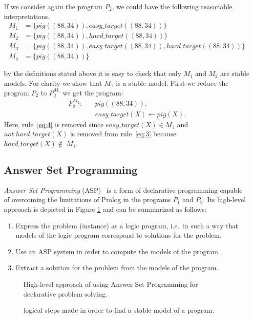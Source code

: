 If we consider again the program \(P_2\), we could have the following reasonable interpretations.
\begin{align*}
M_1&= \{pig((88,34)), \mathit{easy\_target}((88,34))\}  \\
M_2&= \{pig((88,34)), \mathit{hard\_target}((88,34))\} \\
M_3&= \{pig((88,34)), \mathit{easy\_target}((88,34)), \mathit{hard\_target}((88,34))\} \\
M_4&= \{pig((88,34))\}
\end{align*}

by the definitions stated above it is easy to check that only \(M_1\) and \(M_2\) are stable models. For clarity we show that \(M_1\) is a stable model. First we reduce the program \(P_2\) to \(P_2^{M_1}\) we get the program:
\begin{align}
P_2^{M_1} \colon \quad
&pig((88,34)). \\
&\mathit{easy\_target}(X) \leftarrow pig(X). 
\end{align}
Here, rule~\eqref{eq:4} is removed since \(\mathit{easy\_target}(X) \in M_1\) and \(not\; \mathit{hard\_target}(X)\) is removed from rule~\eqref{eq:3} because \(\mathit{hard\_target}(X) \notin\; M_1\).
\subsection{Answer Set Programming}

\emph{Answer Set Programming} (ASP)~\cite{aspPrime} is a form of declarative programming 
capable of overcoming the limitations of Prolog in the programs \(P_1\) and \(P_2\).
Its high-level approach is depicted in Figure \ref{fig:ASP1} and can be summarized as follows:
\begin{enumerate}
\item Express the problem (instance) as a logic program, i.e.~in such a way that models of the logic program correspond to solutions for the problem.
\item Use an ASP system in order to compute the models of the program.
\item Extract a solution for the problem from the models of the program.
\end{enumerate}
\begin{figure}
  \caption{High-level approach of using Answer Set Programming for declarative problem solving.}
  \begin{center}
  \end{center}
  \caption{logical steps made in order to find a stable model of a program.}
  \label{fig:ASP1}
\end{figure}
 
